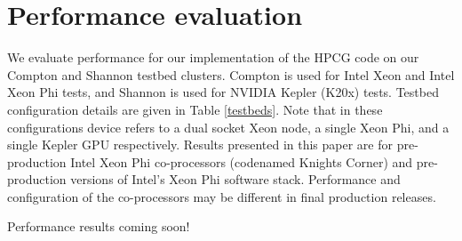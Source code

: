 \documentclass{ccr15}
\begin{document}
\section{Performance evaluation}
We evaluate performance for our implementation of the HPCG code on our Compton and Shannon testbed clusters. Compton is used for Intel Xeon and Intel Xeon Phi tests, and Shannon is used for NVIDIA Kepler (K20x) tests. Testbed configuration details are given in Table \ref{testbeds}. Note that in these configurations device refers to a dual socket Xeon node, a single Xeon Phi, and a single Kepler GPU respectively.
Results presented in this paper are for pre-production Intel Xeon Phi co-processors (codenamed Knights Corner) and pre-production versions of Intel{'}s Xeon Phi software stack. Performance and configuration of the co-processors may be different in final production releases.

\begin{table}[h]
\centering
{}
 \caption{Configurations of testbed clusters}
 \label{testbeds}
\end{table}


Performance results coming soon!
\end{document}
